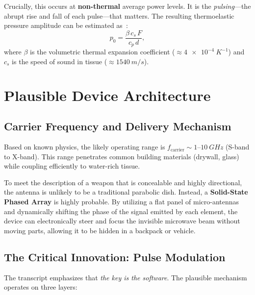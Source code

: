 \documentclass[aps,prl,twocolumn,superscriptaddress,showpacs]{revtex4-2}
\begin{document}
Crucially, this occurs at \textbf{non-thermal} average power levels. It is the \emph{pulsing}---the abrupt
rise and fall of each pulse---that matters. The resulting thermoelastic pressure amplitude can be estimated
as~\cite{Lin2004}:
\begin{equation}
p_0 = \frac{\beta \, c_s \, F}{c_p \, d},
\label{eq:pressure}
\end{equation}
where $\beta$ is the volumetric thermal expansion coefficient
($\approx \SI{4e-4}{K^{-1}}$) and $c_s$ is the speed
of sound in tissue ($\approx \SI{1540}{m/s}$).

\section{Plausible Device Architecture}
\label{sec:device}

\subsection{Carrier Frequency and Delivery Mechanism}

Based on known physics, the likely operating range is $f_{\text{carrier}} \sim 1\text{--}\SI{10}{GHz}$ (S-band to X-band). This range penetrates common building materials (drywall, glass) while coupling efficiently to water-rich tissue.

To meet the description of a weapon that is concealable and highly directional, the antenna is unlikely to be a traditional parabolic dish. Instead, a \textbf{Solid-State Phased Array} is highly probable. By utilizing a flat panel of micro-antennas and dynamically shifting the phase of the signal emitted by each element, the device can electronically steer and focus the invisible microwave beam without moving parts, allowing it to be hidden in a backpack or vehicle.

\subsection{The Critical Innovation: Pulse Modulation}

The transcript emphasizes that \emph{the key is the software}. The plausible mechanism operates on three layers:
\end{document}
